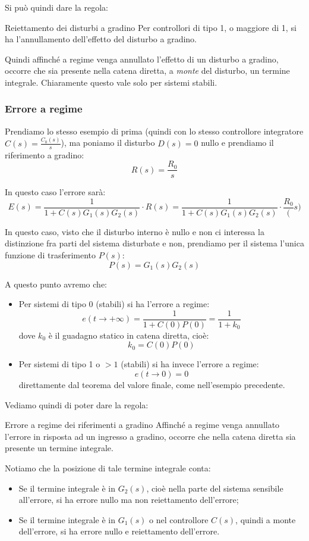 \documentclass[a4paper,11pt]{article}
\begin{document}
Si può quindi dare la regola:
\begin{theorem}{Reiettamento dei disturbi a gradino}
	Per controllori di tipo 1, o maggiore di 1, si ha l'annullamento dell'effetto del disturbo a gradino.
\end{theorem}

Quindi affinché a regime venga annullato l'effetto di un disturbo a gradino, occorre che sia presente nella catena diretta, a \textit{monte} del disturbo, un termine integrale.
Chiaramente questo vale solo per sistemi stabili.

\subsubsection{Errore a regime}
Prendiamo lo stesso esempio di prima (quindi con lo stesso controllore integratore $C(s) = \frac{C_0(s)}{s}$), ma poniamo il disturbo $D(s) = 0$ nullo e prendiamo il riferimento a gradino:
$$
R(s) = \frac{R_0}{s}
$$

In questo caso l'errore sarà:
$$
E(s) = \frac{1}{1 + C(s) G_1(s) G_2(s)} \cdot R(s) = \frac{1}{1 + C(s) G_1(s) G_2(s)} \cdot \frac{R_0}(s)
$$

In questo caso, visto che il disturbo interno è nullo e non ci interessa la distinzione fra parti del sistema disturbate e non, prendiamo per il sistema l'unica funzione di trasferimento $P(s)$:
$$
P(s) = G_1(s) G_2(s)
$$

A questo punto avremo che:
\begin{itemize}
	\item Per sistemi di tipo 0 (stabili) si ha l'errore a regime:
		$$
		e(t \rightarrow +\infty) = \frac{1}{1 + C(0) P(0)} = \frac{1}{1 + k_0}
		$$
		dove $k_0$ è il guadagno statico in catena diretta, cioè:
		$$
		k_0 = C(0) P(0)
		$$
	\item Per sistemi di tipo 1 o $> 1$ (stabili) si ha invece l'errore a regime:
		$$
		e(t \rightarrow 0) = 0
		$$
		direttamente dal teorema del valore finale, come nell'esempio precedente.
\end{itemize}

Vediamo quindi di poter dare la regola:
\begin{theorem}{Errore a regime dei riferimenti a gradino}
	Affinché a regime venga annullato l'errore in risposta ad un ingresso a gradino, occorre che nella catena diretta sia presente un termine integrale.
\end{theorem}

Notiamo che la posizione di tale termine integrale conta:
\begin{itemize}
	\item Se il termine integrale è in $G_2(s)$, cioè nella parte del sistema sensibile all'errore, si ha errore nullo ma non reiettamento dell'errore;
	\item Se il termine integrale è in $G_1(s)$ o nel controllore $C(s)$, quindi a monte dell'errore, si ha errore nullo e reiettamento dell'errore. 
\end{itemize}
\end{document}
